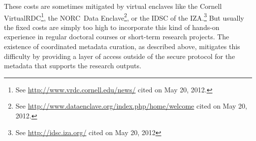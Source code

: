 These costs are sometimes mitigated by virtual enclaves like the Cornell
VirtualRDC\footnote{%
See \href{http://www.vrdc.cornell.edu/news/}{%
http://www.vrdc.cornell.edu/news/} cited on May 20, 2012.}, the NORC\ Data
Enclave\footnote{%
See \href{http://www.dataenclave.org/index.php/home/welcome}{%
http://www.dataenclave.org/index.php/home/welcome} cited on May 20, 2012.},
or the \ac{IDSC} of the \ac{IZA}.\footnote{%
See \href{http://idsc.iza.org/}{http://idsc.iza.org/} cited on May 20, 2012}
But usually the fixed costs are simply too high to incorporate this kind of
hands-on experience in regular doctoral courses or short-term research
projects. The existence of coordinated metadata curation, as described
above, mitigates this difficulty by providing a layer of access outside of
the secure protocol for the metadata that supports the research outputs.
